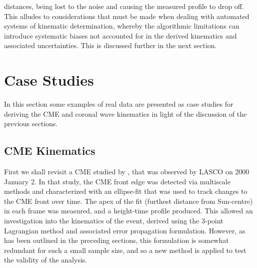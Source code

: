 \documentclass[structabstract]{aa}
\begin{document}
distances, being lost to the noise and causing the measured profile to drop off. This alludes to considerations that must be made when dealing with automated systems of kinematic determination, whereby the algorithmic limitations can introduce systematic biases not accounted for in the derived kinematics and associated uncertainties. This is discussed further in the next section.




\section{Case Studies}
\label{sect:case_studies}

In this section some examples of real data are presented as case studies for deriving the CME and coronal wave kinematics in light of the discussion of the previous sections. %

\subsection{CME Kinematics}
\label{subsect:corimp}


First we shall revisit a CME studied by \citet{2009A&A...495..325B}, that was observed by LASCO on 2000 January 2. In that study, the CME front edge was detected via multiscale methods and characterized with an ellipse-fit that was used to track changes to the CME front over time. The apex of the fit (furthest distance from Sun-centre) in each frame was measured, and a height-time profile produced. This allowed an investigation into the kinematics of the event, derived using the 3-point Lagrangian method and associated error propagation formulation. However, as has been outlined in the preceding sections, this formulation is somewhat redundant for such a small sample size, and so a new method is applied to test the validity of the analysis.
\end{document}
